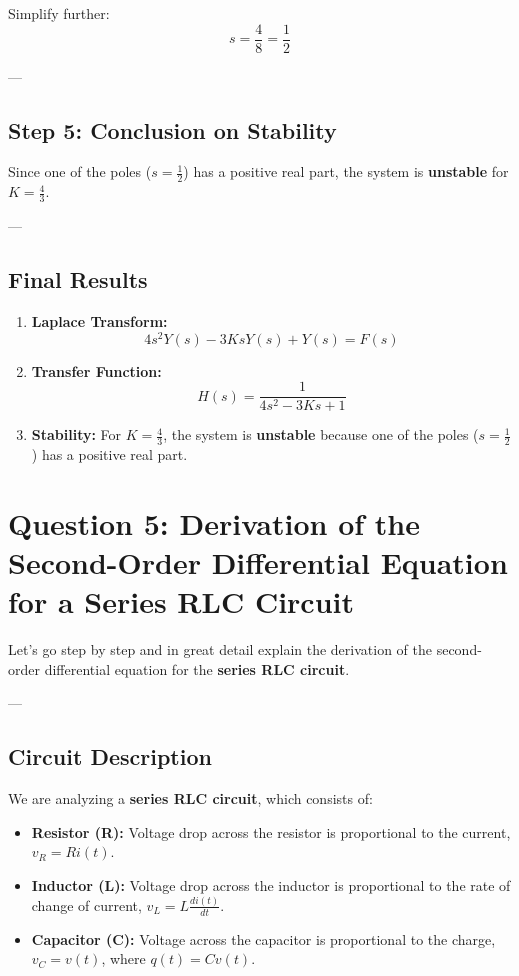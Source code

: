 \documentclass[12pt]{article}
\begin{document}
Simplify further:
\[
s = \frac{4}{8} = \frac{1}{2}
\]

---

\subsection*{Step 5: Conclusion on Stability}

Since one of the poles (\( s = \frac{1}{2} \)) has a positive real part, the system is \textbf{unstable} for \( K = \frac{4}{3} \).

---

\subsection*{Final Results}

\begin{enumerate}
    \item \textbf{Laplace Transform:}
    \[
    4 s^2 Y(s) - 3K s Y(s) + Y(s) = F(s)
    \]

    \item \textbf{Transfer Function:}
    \[
    H(s) = \frac{1}{4 s^2 - 3K s + 1}
    \]

    \item \textbf{Stability:}
    For \( K = \frac{4}{3} \), the system is \textbf{unstable} because one of the poles (\( s = \frac{1}{2} \)) has a positive real part.
\end{enumerate}
\section*{Question 5: Derivation of the Second-Order Differential Equation for a Series RLC Circuit}

Let’s go step by step and in great detail explain the derivation of the second-order differential equation for the \textbf{series RLC circuit}.

---

\subsection*{Circuit Description}

We are analyzing a \textbf{series RLC circuit}, which consists of:
\begin{itemize}
    \item \textbf{Resistor (R):} Voltage drop across the resistor is proportional to the current, \( v_R = R i(t) \).
    \item \textbf{Inductor (L):} Voltage drop across the inductor is proportional to the rate of change of current, \( v_L = L \frac{di(t)}{dt} \).
    \item \textbf{Capacitor (C):} Voltage across the capacitor is proportional to the charge, \( v_C = v(t) \), where \( q(t) = C v(t) \).
\end{itemize}
\end{document}
